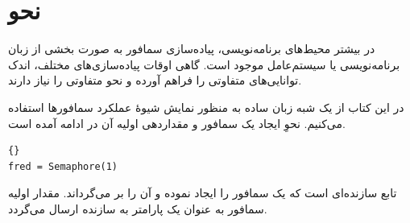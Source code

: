 \documentclass{book}
\begin{document}
\section{نحو}

    در بیشتر محیط‌های برنامه‌نویسی، پیاده‌سازی سمافور به صورت بخشی از زبان برنامه‌نویسی یا سیستم‌عامل موجود است. 
    گاهی اوقات پیاده‌سازی‌های مختلف،‌ اندک توانایی‌های متفاوتی را فراهم آورده و نحو متفاوتی را نیاز دارند.

    در این کتاب از یک شبه زبان ساده به منظور نمایش شیوهٔ عملکرد سمافورها استفاده می‌کنیم. 
    نحوِ ایجاد یک سمافور و مقداردهی اولیه آن در ادامه آمده است.
%
\begin{latin}
\begin{latin}
\begin{lstlisting}[title=\rl{نحوِ مقداردهی اولیه سمافور}]{}
fred = Semaphore(1)
\end{lstlisting}
\end{latin}
\end{latin}
%
    تابع  سازنده‌ای است که یک سمافور را ایجاد نموده 
    و آن را بر می‌گرداند. مقدار اولیه سمافور به عنوان یک پارامتر به سازنده ارسال می‌گردد. 
\end{document}
